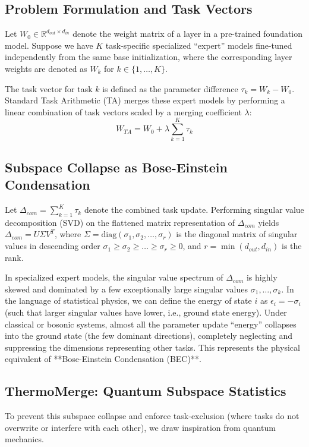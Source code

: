 \documentclass{article}
\theoremstyle{plain}
\theoremstyle{definition}
\theoremstyle{remark}
\begin{document}
\subsection{Problem Formulation and Task Vectors}
Let $W_0 \in \mathbb{R}^{d_{out} \times d_{in}}$ denote the weight matrix of a layer in a pre-trained foundation model. Suppose we have $K$ task-specific specialized ``expert'' models fine-tuned independently from the same base initialization, where the corresponding layer weights are denoted as $W_k$ for $k \in \{1, \dots, K\}$.

The task vector for task $k$ is defined as the parameter difference $\tau_k = W_k - W_0$. Standard Task Arithmetic (TA) merges these expert models by performing a linear combination of task vectors scaled by a merging coefficient $\lambda$:
\begin{equation}
    W_{TA} = W_0 + \lambda \sum_{k=1}^K \tau_k
\end{equation}

\subsection{Subspace Collapse as Bose-Einstein Condensation}
Let $\Delta_{com} = \sum_{k=1}^K \tau_k$ denote the combined task update. Performing singular value decomposition (SVD) on the flattened matrix representation of $\Delta_{com}$ yields $\Delta_{com} = U \Sigma V^T$, where $\Sigma = \text{diag}(\sigma_1, \sigma_2, \dots, \sigma_r)$ is the diagonal matrix of singular values in descending order $\sigma_1 \ge \sigma_2 \ge \dots \ge \sigma_r \ge 0$, and $r = \min(d_{out}, d_{in})$ is the rank.

In specialized expert models, the singular value spectrum of $\Delta_{com}$ is highly skewed and dominated by a few exceptionally large singular values $\sigma_1, \dots, \sigma_k$. In the language of statistical physics, we can define the energy of state $i$ as $\epsilon_i = -\sigma_i$ (such that larger singular values have lower, i.e., ground state energy). Under classical or bosonic systems, almost all the parameter update ``energy'' collapses into the ground state (the few dominant directions), completely neglecting and suppressing the dimensions representing other tasks. This represents the physical equivalent of **Bose-Einstein Condensation (BEC)**.

\subsection{ThermoMerge: Quantum Subspace Statistics}
To prevent this subspace collapse and enforce task-exclusion (where tasks do not overwrite or interfere with each other), we draw inspiration from quantum mechanics.
\end{document}
